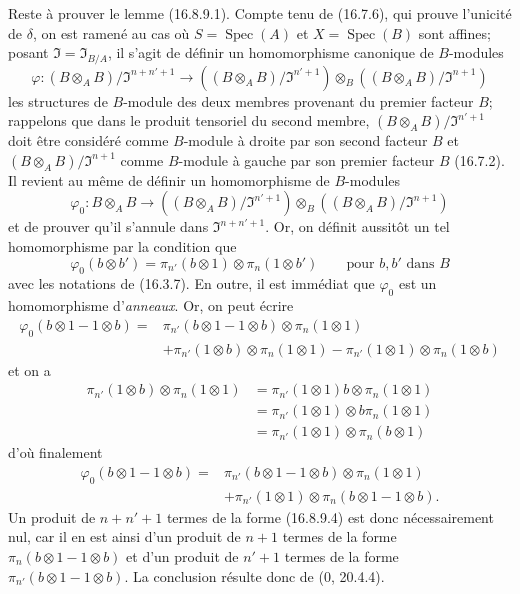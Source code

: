 Reste à prouver le lemme (16.8.9.1). Compte tenu de (16.7.6), qui prouve
l'unicité de $\delta$, on est ramené au cas où $S=\operatorname{Spec}(A)$ et
$X=\operatorname{Spec}(B)$ sont affines; posant
$\mathfrak{I}=\mathfrak{I}_{B/A}$, il s'agit de définir un homomorphisme
canonique de $B$-modules
\[
  \varphi:(B\otimes_A B)/\mathfrak{I}^{n+n'+1}
  \longrightarrow
  ((B\otimes_A B)/\mathfrak{I}^{n'+1})
  \otimes_B((B\otimes_A B)/\mathfrak{I}^{n+1})
\]
les structures de $B$-module des deux membres provenant du premier facteur
$B$; rappelons que dans le produit tensoriel du second membre,
$(B\otimes_A B)/\mathfrak{I}^{n'+1}$ doit être considéré
comme $B$-module à droite par son second facteur $B$ et
$(B\otimes_A B)/\mathfrak{I}^{n+1}$ comme $B$-module à gauche par son premier
facteur $B$ (16.7.2). Il revient au même de définir un homomorphisme de
$B$-modules
\[
  \varphi_0:B\otimes_A B\longrightarrow
  ((B\otimes_A B)/\mathfrak{I}^{n'+1})
  \otimes_B((B\otimes_A B)/\mathfrak{I}^{n+1})
\]
et de prouver qu'il s'annule dans $\mathfrak{I}^{n+n'+1}$. Or, on définit
aussitôt un tel homomorphisme par la condition que
\[
  \varphi_0(b\otimes b')
  =\pi_{n'}(b\otimes1)\otimes\pi_n(1\otimes b')
  \qquad\text{pour $b,b'$ dans $B$}
\]
avec les notations de (16.3.7). En outre, il est immédiat que $\varphi_0$ est
un homomorphisme d'\emph{anneaux}. Or, on peut écrire
\[
  \begin{aligned}
  \varphi_0(b\otimes1-1\otimes b)
  ={}&\pi_{n'}(b\otimes1-1\otimes b)\otimes\pi_n(1\otimes1)\\
  &+\pi_{n'}(1\otimes b)\otimes\pi_n(1\otimes1)
  -\pi_{n'}(1\otimes1)\otimes\pi_n(1\otimes b)
  \end{aligned}
\]
et on a
\[
  \begin{aligned}
  \pi_{n'}(1\otimes b)\otimes\pi_n(1\otimes1)
  &=\pi_{n'}(1\otimes1)b\otimes\pi_n(1\otimes1)\\
  &=\pi_{n'}(1\otimes1)\otimes b\pi_n(1\otimes1)\\
  &=\pi_{n'}(1\otimes1)\otimes\pi_n(b\otimes1)
  \end{aligned}
\]
d'où finalement
\[
  \begin{aligned}
  \varphi_0(b\otimes1-1\otimes b)
  ={}&\pi_{n'}(b\otimes1-1\otimes b)\otimes\pi_n(1\otimes1)\\
  &+\pi_{n'}(1\otimes1)\otimes\pi_n(b\otimes1-1\otimes b).
  \end{aligned}
  \tag{16.8.9.4}
  \label{IV.16.8.9.4}
\]
Un produit de $n+n'+1$ termes de la forme (16.8.9.4) est donc
nécessairement nul, car il en est ainsi d'un produit de $n+1$ termes de la
forme $\pi_n(b\otimes1-1\otimes b)$ et d'un produit de $n'+1$ termes de la
forme $\pi_{n'}(b\otimes1-1\otimes b)$. La conclusion résulte donc de
(0, 20.4.4).

